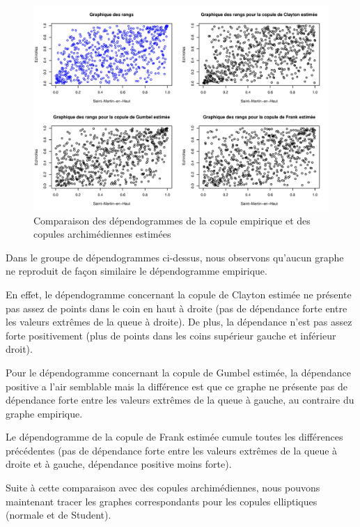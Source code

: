 \noindent%
\begin{figure}[H]
    \begin{center}
      \includegraphics[width=17 cm, angle=0]{./pictures/dependarch.png}
      \centering\caption{\label{2}Comparaison des dépendogrammes de la copule empirique et des copules archimédiennes estimées}
    \end{center}
\end{figure}

Dans le groupe de dépendogrammes ci-dessus, nous observons qu'aucun graphe ne reproduit de façon similaire le dépendogramme empirique. 

En effet, le dépendogramme concernant la copule de Clayton estimée ne présente pas assez de points dans le coin en haut à droite (pas de dépendance forte entre les valeurs extrêmes de la queue à droite). De plus, la dépendance n'est pas assez forte positivement (plus de points dans les coins supérieur gauche et inférieur droit).

Pour le dépendogramme concernant la copule de Gumbel estimée, la dépendance positive a l'air semblable mais la différence est que ce graphe ne présente pas de dépendance forte entre les valeurs extrêmes de la queue à gauche, au contraire du graphe empirique.

Le dépendogramme de la copule de Frank estimée cumule toutes les différences précédentes (pas de dépendance forte entre les valeurs extrêmes de la queue à droite et à gauche, dépendance positive moins forte).

Suite à cette comparaison avec des copules archimédiennes, nous pouvons maintenant tracer les graphes correspondants pour les copules elliptiques (normale et de Student).


